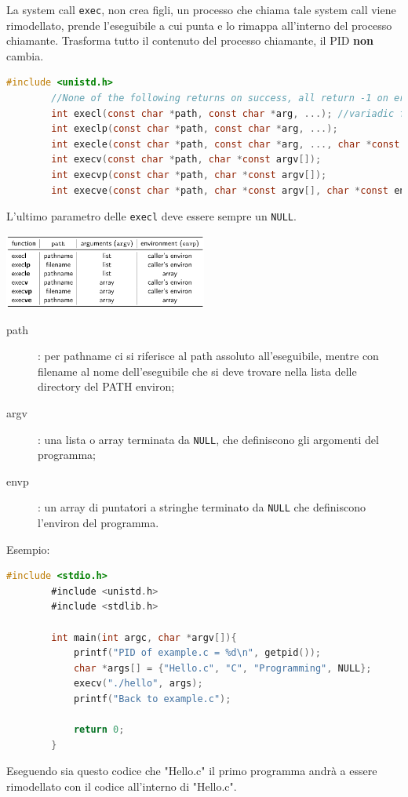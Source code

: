 \documentclass[a4paper, 12pt]{book}
\begin{document}
    La system call \verb|exec|, non crea figli, un processo che chiama 
    tale system call viene rimodellato, prende l'eseguibile a cui punta 
    e lo rimappa all'interno del processo chiamante. Trasforma tutto il contenuto del
    processo chiamante, il PID \textbf{non} cambia.
    \begin{lstlisting}[language=C]
        #include <unistd.h>
        //None of the following returns on success, all return -1 on error 
        int execl(const char *path, const char *arg, ...); //variadic functions
        int execlp(const char *path, const char *arg, ...);
        int execle(const char *path, const char *arg, ..., char *const envp[]);
        int execv(const char *path, char *const argv[]);
        int execvp(const char *path, char *const argv[]);
        int execve(const char *path, char *const argv[], char *const envp[]);
    \end{lstlisting}
    L'ultimo parametro delle \verb|execl| deve essere sempre un \verb|NULL|.
    \begin{center}
        \includegraphics[width=0.5\textwidth]{exec.png}
    \end{center}
    \begin{description}
        \item[path]: per pathname ci si riferisce al path assoluto all'eseguibile,
        mentre con filename al nome dell'eseguibile che si deve trovare nella lista 
        delle directory del PATH environ;
        \item[argv]: una lista o array terminata da \verb|NULL|, che definiscono gli argomenti del programma;
        \item[envp]: un array di puntatori a stringhe terminato da \verb|NULL| che definiscono l'environ del programma.  
    \end{description}
    Esempio:
    \begin{lstlisting}[language=C]
        #include <stdio.h>
        #include <unistd.h>
        #include <stdlib.h>
        
        int main(int argc, char *argv[]){
            printf("PID of example.c = %d\n", getpid());
            char *args[] = {"Hello.c", "C", "Programming", NULL};
            execv("./hello", args);
            printf("Back to example.c");

            return 0;
        }
    \end{lstlisting}
    Eseguendo sia questo codice che "Hello.c" il primo programma 
    andrà a essere rimodellato con il codice all'interno di "Hello.c".
\end{document}
